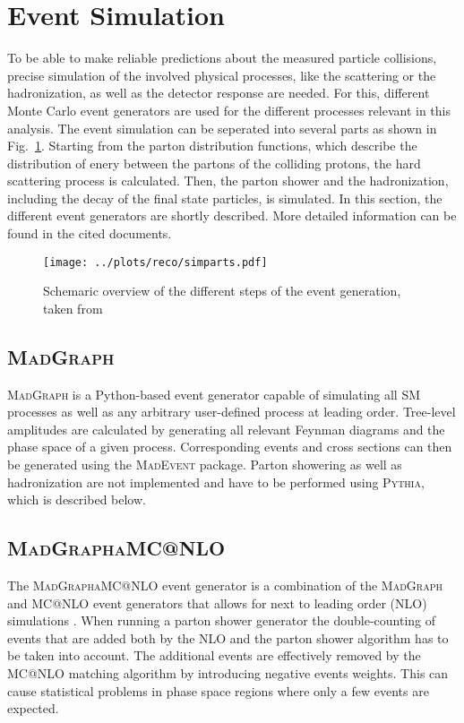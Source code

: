 \section{Event Simulation}
\label{sec:MC}
To be able to make reliable predictions about the measured particle collisions, precise simulation of the involved physical processes, like the scattering or the hadronization, as well as the detector response are needed. For this, different Monte Carlo event generators are used for the different processes relevant in this analysis. The event simulation can be seperated into several parts as shown in Fig.~\ref{fig:reco:simparts}. Starting from the parton distribution functions, which describe the distribution of enery between the partons of the colliding protons, the hard scattering process is calculated. Then, the parton shower and the hadronization, including the decay of the final state particles, is simulated. In this section, the different event generators are shortly described. More detailed information can be found in the cited documents.\\
\begin{figure}
    \centering
    \texttt{[image: ../plots/reco/simparts.pdf]}
    \caption[Schemaric overview of the different steps of the event generation]{Schemaric overview of the different steps of the event generation, taken from \cite{MCfig}}
    \label{fig:reco:simparts}
\end{figure}

\subsection*{\textsc{MadGraph}}
\textsc{MadGraph} \cite{madgraph} is a Python-based event generator capable of simulating all SM processes as well as any arbitrary user-defined process at leading order. Tree-level amplitudes are calculated by generating all relevant Feynman diagrams and the phase space of a given process. Corresponding events and cross sections can then be generated using the \textsc{MadEvent} package. Parton showering as well as hadronization are not implemented and have to be performed using \textsc{Pythia}, which is described below.
\subsection*{\textsc{MadGraph\textunderscore aMC@NLO}}
The \textsc{MadGraph\textunderscore aMC@NLO} event generator is a combination of the \textsc{MadGraph} and \textsc{MC@NLO} event generators that allows for next to leading order (NLO) simulations \cite{madgraphamc}. When running a parton shower generator the double-counting of events that are added both by the NLO and the parton shower algorithm has to be taken into account. The additional events are effectively removed by the \textsc{MC@NLO} matching algorithm by introducing negative events weights. This can cause statistical problems in phase space regions where only a few events are expected.
